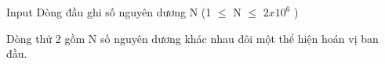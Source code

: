 Input
Dòng đầu ghi số nguyên dương N (1  $\le$  N  $\le$  $2x10^{6}$ )


Dòng thứ 2 gồm N số nguyên dương khác nhau đôi một thể hiện hoán vị ban đầu.